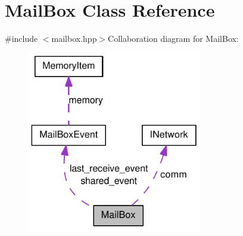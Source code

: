 \hypertarget{class_mail_box}{
\section{MailBox Class Reference}
\label{class_mail_box}
}


{\ttfamily \#include $<$mailbox.hpp$>$}Collaboration diagram for MailBox:\nopagebreak
\begin{figure}[H]
\begin{center}
\leavevmode
\includegraphics[width=215pt]{class_mail_box__coll__graph}
\end{center}
\end{figure}
